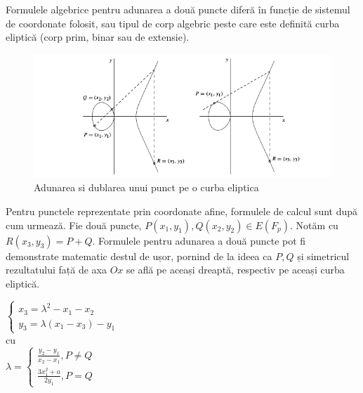 \begin{obs}
Formulele algebrice pentru adunarea a două puncte diferă în funcție de sistemul de coordonate folosit, sau tipul de corp algebric peste care este definită curba eliptică (corp prim, binar sau de extensie).
\end{obs}

\begin{figure}[htp]
\centering
\includegraphics[width=13cm]{chapters/Addition.png}
\caption{Adunarea si dublarea unui punct pe o curba eliptica}
\label{fig:lion}
\end{figure}

\begin{dfn}
Pentru punctele reprezentate prin coordonate afine, formulele de calcul sunt după cum urmează. Fie două puncte, $P(x_{1}, y_1), Q(x_2, y_2)\in E(F_p)$. Notăm cu $R(x_3, y_3) = P + Q$. Formulele pentru adunarea a două puncte pot fi demonstrate matematic destul de ușor, pornind de la ideea ca $P, Q$ și simetricul rezultatului față de axa $Ox$ se află pe aceași dreaptă, respectiv pe aceași curba eliptică.

$\begin{cases} 
    x_3 = \lambda^2 - x_1 - x_2 \\
    y_3 =  \lambda (x_1-x_3) - y_1
   \end{cases}$
 \\cu 
 \\$
 \lambda = 
 \begin{cases}
 \frac{y_2 - y_1}{x_2 - x_1}, P \neq Q \\ 
 \frac{3x^{2}_1 + a}{2y_1}, P = Q
 \end{cases}$ \\
\end{dfn}

